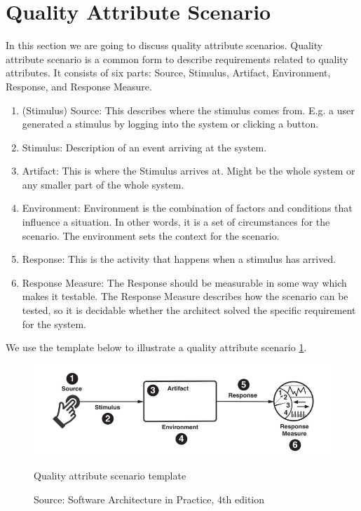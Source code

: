 
\section{Quality Attribute Scenario}
\label{sec:qas}
In this section we are going to discuss quality attribute scenarios. Quality attribute scenario is a common form to describe requirements related to quality attributes. It consists of six parts: Source, Stimulus, Artifact, Environment, Response, and Response Measure.
\begin{enumerate}
    \item (Stimulus) Source: This describes where the stimulus comes from. E.g. a user generated a stimulus by logging into the system or clicking a button.
    \item Stimulus: Description of an event arriving at the system.
    \item Artifact: This is where the Stimulus arrives at. Might be the whole system or any smaller part of the whole system.
    \item Environment: Environment is the combination of factors and conditions that influence a situation. In other words, it is a set of circumstances for the scenario. The environment sets the context for the scenario.
    \item Response: This is the activity that happens when a stimulus has arrived.
    \item Response Measure: The Response should be measurable in some way which makes it testable. The Response Measure describes how the scenario can be tested, so it is decidable whether the architect solved the specific requirement for the system.
\end{enumerate}
We use the template below to illustrate a quality attribute scenario \ref{fig:qa_scenario_template}.
\begin{figure}[ht]
\centering
  \includegraphics[width=\linewidth]{images/qa_scenario.png}
  \caption{Quality attribute scenario template}
  \caption*{Source: Software Architecture in Practice, 4th edition \cite{bass2021software}}
  \label{fig:qa_scenario_template}
\end{figure}

